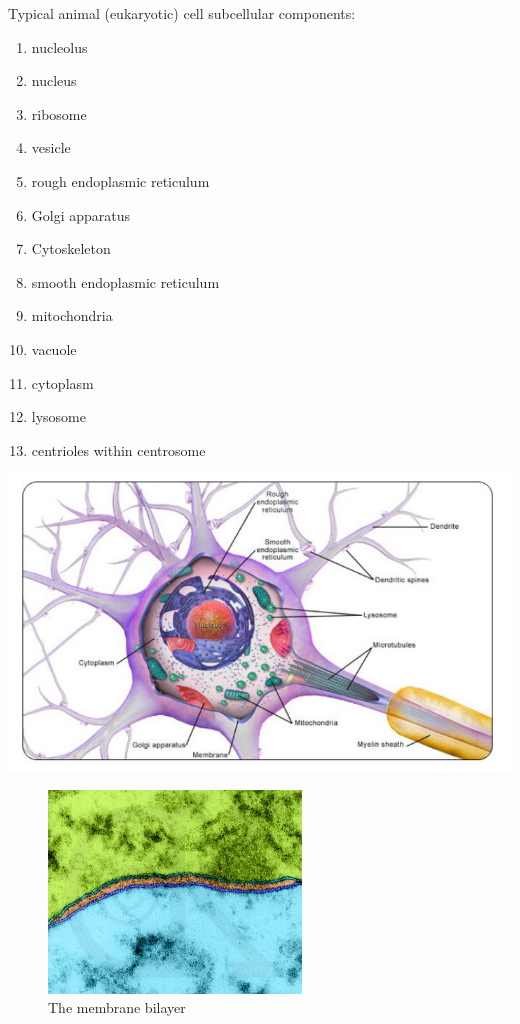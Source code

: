 \documentclass[english,11pt]{article}
\begin{document}
Typical animal (eukaryotic)
cell subcellular components:
\begin{enumerate}
\item nucleolus
\item nucleus
\item ribosome
\item vesicle
\item rough endoplasmic reticulum
\item Golgi apparatus
\item Cytoskeleton
\item smooth endoplasmic reticulum
\item mitochondria
\item vacuole
\item cytoplasm
\item lysosome
\item centrioles within centrosome
\end{enumerate}

\includegraphics[width=\textwidth]{neuron.png}



\begin{figure}[h]
\begin{center}
\includegraphics[width=0.6\textwidth]{bilayer.png}
\end{center}
\caption{The membrane bilayer}
\end{figure}
\end{document}
